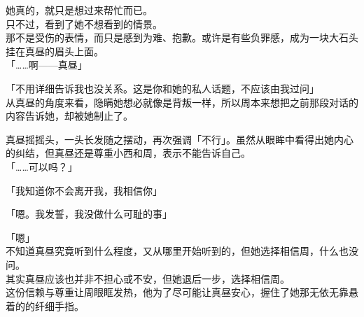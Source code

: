 她真的，就只是想过来帮忙而已。\\

只不过，看到了她不想看到的情景。\\

那不是受伤的表情，而只是感到为难、抱歉。或许是有些负罪感，成为一块大石头挂在真昼的眉头上面。\\

「……啊——真昼」

「不用详细告诉我也没关系。这是你和她的私人话题，不应该由我过问」\\

从真昼的角度来看，隐瞒她想必就像是背叛一样，所以周本来想把之前那段对话的内容告诉她，却被她制止了。

真昼摇摇头，一头长发随之摆动，再次强调「不行」。虽然从眼眸中看得出她内心的纠结，但真昼还是尊重小西和周，表示不能告诉自己。\\

「……可以吗？」

「我知道你不会离开我，我相信你」

「嗯。我发誓，我没做什么可耻的事」

「嗯」\\

不知道真昼究竟听到什么程度，又从哪里开始听到的，但她选择相信周，什么也没问。\\

其实真昼应该也并非不担心或不安，但她退后一步，选择相信周。\\

这份信赖与尊重让周眼眶发热，他为了尽可能让真昼安心，握住了她那无依无靠悬着的的纤细手指。
